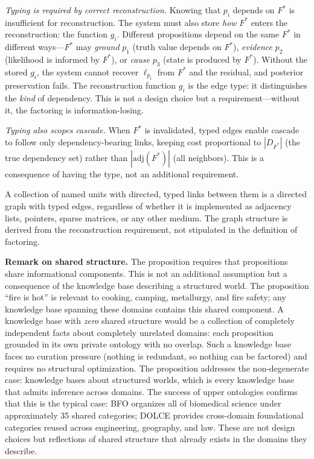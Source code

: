 \documentclass[11pt]{article}
\theoremstyle{definition}
\begin{document}
\emph{Typing is required by correct reconstruction.}
Knowing that $p_i$ depends on $F^*$ is insufficient for
reconstruction. The system must also store \emph{how} $F^*$ enters
the reconstruction: the function $g_i$. Different propositions
depend on the same $F^*$ in different ways---$F^*$ may \emph{ground}
$p_1$ (truth value depends on $F^*$), \emph{evidence} $p_2$
(likelihood is informed by $F^*$), or \emph{cause} $p_3$ (state is
produced by $F^*$). Without the stored $g_i$, the system cannot
recover $\ell_{p_i}$ from $F^*$ and the residual, and posterior
preservation fails. The reconstruction function $g_i$ is the edge
type: it distinguishes the \emph{kind} of dependency. This is not a
design choice but a requirement---without it, the factoring is
information-losing.

\emph{Typing also scopes cascade.} When $F^*$ is invalidated,
typed edges enable cascade to follow only dependency-bearing
links, keeping cost proportional to $|D_{F^*}|$ (the true dependency
set) rather than $|\mathrm{adj}(F^*)|$ (all neighbors). This is a
consequence of having the type, not an additional requirement.

A collection of named units with directed, typed links between them
is a directed graph with typed edges, regardless of whether it is
implemented as adjacency lists, pointers, sparse matrices, or any other
medium. The graph structure is derived from the reconstruction
requirement, not stipulated in the definition of factoring.

\textbf{Remark on shared structure.} The proposition requires that
propositions share informational components. This is not an additional
assumption but a consequence of the knowledge base describing a
structured world. The proposition ``fire is hot'' is relevant to
cooking, camping, metallurgy, and fire safety; any knowledge base
spanning these domains contains this shared component. A knowledge base
with \emph{zero} shared structure would be a collection of completely
independent facts about completely unrelated domains: each proposition
grounded in its own private ontology with no overlap. Such a knowledge
base faces no curation pressure (nothing is redundant, so nothing can
be factored) and requires no structural optimization. The proposition
addresses the non-degenerate case: knowledge bases about structured
worlds, which is every knowledge base that admits inference across
domains. The success of upper ontologies confirms that this is the
typical case: BFO \cite{Arp2015} organizes all of biomedical science
under approximately 35 shared categories; DOLCE \cite{Masolo2003}
provides cross-domain foundational categories reused across engineering,
geography, and law. These are not design choices but reflections of
shared structure that already exists in the domains they describe.
\end{document}
